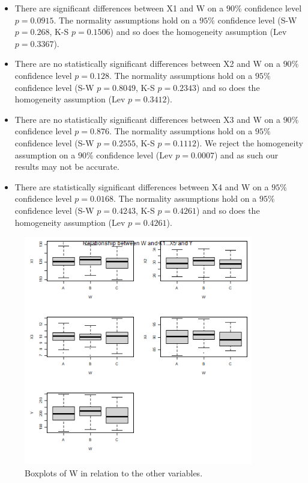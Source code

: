 \documentclass[12pt, a4paper]{article}
\begin{document}
	\begin{itemize}
		\item There are significant differences between X1 and W  on a $90\%$ confidence level $p = 0.0915$. The normality assumptions hold on a $95\%$ confidence level (S-W $p=0.268$, K-S $p=0.1506$) and so does the homogeneity assumption (Lev $p=0.3367$).
		
		\item There are no statistically significant differences between X2 and W  on a $90\%$ confidence level $p = 0.128$. The normality assumptions hold on a $95\%$ confidence level (S-W $p=0.8049$, K-S $p=0.2343$) and so does the homogeneity assumption (Lev $p=0.3412$).
		
		\item There are no statistically significant differences between X3 and W  on a $90\%$ confidence level $p = 0.876$. The normality assumptions hold on a $95\%$ confidence level (S-W $p=0.2555$, K-S $p=0.1112$). We reject the homogeneity assumption on a $90\%$ confidence level (Lev $p=0.0007$) and as such our results may not be accurate.
		
		\item There are statistically significant differences between X4 and W on a $95\%$ confidence level $p = 0.0168$. The normality assumptions hold on a $95\%$ confidence level (S-W $p=0.4243$, K-S $p=0.4261$) and so does the homogeneity assumption (Lev $p=0.4261$).
		
	\end{itemize}
	 
	
	\begin{figure}
		\includegraphics[width=10cm]{boxplots_1.png}
		\centering
		\caption{Boxplots of W in relation to the other variables.}
		\label{fig::boxplots_1}
	\end{figure}
	
\end{document}
